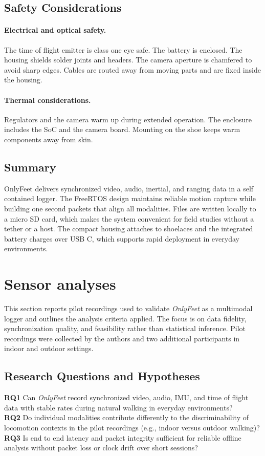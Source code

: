 \documentclass[manuscript,review,anonymous]{acmart}
\begin{document}
\subsection{Safety Considerations}
\paragraph{Electrical and optical safety.}
The time of flight emitter is class one eye safe. The battery is enclosed. The housing shields solder joints and headers. The camera aperture is chamfered to avoid sharp edges. Cables are routed away from moving parts and are fixed inside the housing.

\paragraph{Thermal considerations.}
Regulators and the camera warm up during extended operation. The enclosure includes the SoC and the camera board. Mounting on the shoe keeps warm components away from skin.

\subsection{Summary}
OnlyFeet delivers synchronized video, audio, inertial, and ranging data in a self contained logger. The FreeRTOS design maintains reliable motion capture while building one second packets that align all modalities. Files are written locally to a micro SD card, which makes the system convenient for field studies without a tether or a host. The compact housing attaches to shoelaces and the integrated battery charges over USB C, which supports rapid deployment in everyday environments.

\section{Sensor analyses}
This section reports pilot recordings used to validate \textit{OnlyFeet} as a multimodal logger and outlines the analysis criteria applied. The focus is on data fidelity, synchronization quality, and feasibility rather than statistical inference. Pilot recordings were collected by the authors and two additional participants in indoor and outdoor settings.

\subsection{Research Questions and Hypotheses}
\textbf{RQ1} Can \textit{OnlyFeet} record synchronized video, audio, IMU, and time of flight data with stable rates during natural walking in everyday environments? \\
\textbf{RQ2} Do individual modalities contribute differently to the discriminability of locomotion contexts in the pilot recordings (e.g., indoor versus outdoor walking)? \\
\textbf{RQ3} Is end to end latency and packet integrity sufficient for reliable offline analysis without packet loss or clock drift over short sessions?
\end{document}

